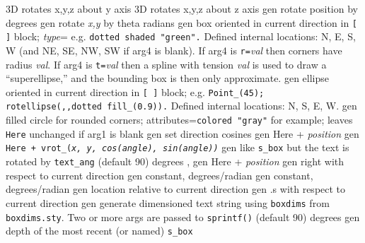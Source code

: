   {3D} {rotates x,y,z about y axis}
  {3D} {rotates x,y,z about z axis}
  {gen}
  {rotate position by degrees}
  {gen}
  {rotate {\sl x,y} by theta radians}
  {gen}
  {box oriented in current direction in {\tt [ ]} block;
   {\sl type}= e.g. {\tt dotted shaded "green".}  Defined internal
   locations: N, E, S, W (and NE, SE, NW, SW if arg4 is blank).  If arg4
   is {\tt r=}{\sl val} then corners have radius {\sl val}.  If arg4 is
   {\tt t=}{\sl val} then a spline with tension {\sl val} is used to draw
   a ``superellipse,'' and the bounding box is then only approximate. }
  {gen}
  {ellipse oriented in current direction in {\tt [ ]} block;
   e.g. {\tt Point\_(45); rotellipse(,{},dotted fill\_(0.9)).} Defined
   internal locations: N, S, E, W.}
  {gen}
  {filled circle for rounded corners; attributes={\tt colored
  "gray"}
   for example; leaves {\tt Here} unchanged if arg1 is blank
    }
  {gen}
  {set direction cosines}
  {gen}
  {Here + {\sl position}}
  {gen}
  {\tt Here + vrot\_({\sl x, y, cos(angle), sin(angle))}}
  {gen}
  {like {\tt s\_box} but the text is rotated by {\tt text\_ang}
   (default 90) degrees , }
  {gen}
  {Here + {\sl position}}
  {gen}
  {right with respect to current direction}
  {gen}
  {constant, degrees/radian}
  {gen}
  {constant, degrees/radian}
  {gen}
  {location relative to current direction}
%
  {gen}
  {.s with respect to current direction}
  {gen}
  {generate dimensioned text string using {\tt{}boxdims} from
    {\tt boxdims.sty}. Two or more args are passed to {\tt sprintf()}
   (default 90) degrees }
  {gen}
  {depth of the most recent (or named) {\tt s\_box}
    }
